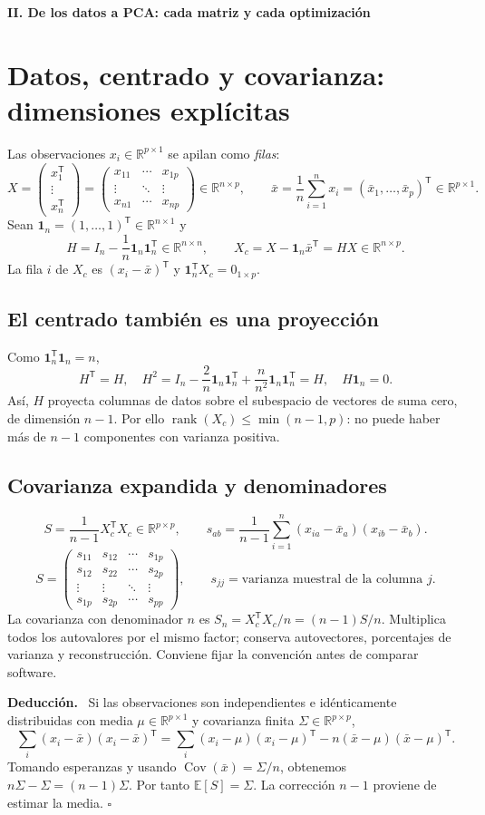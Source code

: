 \documentclass[11pt,a4paper]{article}
\newcommand{\R}{\mathbb R}
\newcommand{\E}{\mathbb E}
\newcommand{\T}{^{\mathsf T}}
\DeclareMathOperator{\Cov}{Cov}
\newenvironment{deduccion}{\par\textbf{Deducción.}\ }{\hfill$\square$\par}
\DeclareMathOperator{\rank}{rank}
\newcommand{\ones}{\mathbf 1}
\theoremstyle{definition}
\newcommand{\parte}[1]{\par\bigskip\Needspace{8\baselineskip}\begin{center}{\Large\bfseries\color{azul}#1}\end{center}}
\begin{document}
\parte{II. De los datos a PCA: cada matriz y cada optimización}
\section{Datos, centrado y covarianza: dimensiones explícitas}
Las observaciones $x_i\in\R^{p\times1}$ se apilan como \emph{filas}:
\[
X=\begin{pmatrix}x_1\T\\\vdots\\x_n\T\end{pmatrix}
=\begin{pmatrix}x_{11}&\cdots&x_{1p}\\\vdots&\ddots&\vdots\\x_{n1}&\cdots&x_{np}\end{pmatrix}\in\R^{n\times p},\qquad
\bar x=\frac1n\sum_{i=1}^nx_i=(\bar x_1,\ldots,\bar x_p)\T\in\R^{p\times1}.
\]
Sean $\ones_n=(1,\ldots,1)\T\in\R^{n\times1}$ y
\[
H=I_n-\frac1n\ones_n\ones_n\T\in\R^{n\times n},\qquad
X_c=X-\ones_n\bar x\T=HX\in\R^{n\times p}.
\]
La fila $i$ de $X_c$ es $(x_i-\bar x)\T$ y $\ones_n\T X_c=0_{1\times p}$.
\subsection{El centrado también es una proyección}
Como $\ones_n\T\ones_n=n$,
\[
H\T=H,\quad H^2=I_n-\frac2n\ones_n\ones_n\T+\frac{n}{n^2}\ones_n\ones_n\T=H,
\quad H\ones_n=0.
\]
Así, $H$ proyecta columnas de datos sobre el subespacio de vectores de suma cero, de dimensión $n-1$. Por ello $\rank(X_c)\le\min(n-1,p)$: no puede haber más de $n-1$ componentes con varianza positiva.
\subsection{Covarianza expandida y denominadores}
\[
\boxed{S=\frac1{n-1}X_c\T X_c\in\R^{p\times p}},\qquad
s_{ab}=\frac1{n-1}\sum_{i=1}^n(x_{ia}-\bar x_a)(x_{ib}-\bar x_b).
\]
\[
S=\begin{pmatrix}s_{11}&s_{12}&\cdots&s_{1p}\\s_{12}&s_{22}&\cdots&s_{2p}\\\vdots&\vdots&\ddots&\vdots\\s_{1p}&s_{2p}&\cdots&s_{pp}\end{pmatrix},\qquad
s_{jj}=\text{varianza muestral de la columna }j.
\]
La covarianza con denominador $n$ es $S_n=X_c\T X_c/n=(n-1)S/n$. Multiplica todos los autovalores por el mismo factor; conserva autovectores, porcentajes de varianza y reconstrucción. Conviene fijar la convención antes de comparar software.
\begin{deduccion}
Si las observaciones son independientes e idénticamente distribuidas con media $\mu\in\R^{p\times1}$ y covarianza finita $\Sigma\in\R^{p\times p}$,
\[
\sum_i(x_i-\bar x)(x_i-\bar x)\T
=\sum_i(x_i-\mu)(x_i-\mu)\T-n(\bar x-\mu)(\bar x-\mu)\T.
\]
Tomando esperanzas y usando $\Cov(\bar x)=\Sigma/n$, obtenemos $n\Sigma-\Sigma=(n-1)\Sigma$. Por tanto $\E[S]=\Sigma$. La corrección $n-1$ proviene de estimar la media.
\end{deduccion}
\end{document}
